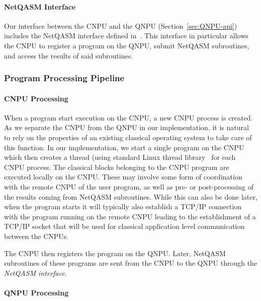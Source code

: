 \paragraph{NetQASM Interface}

Our interface between the \ac{CNPU} and the \ac{QNPU} (Section~\ref{sec:QNPU-api}) includes the \ac{NetQASM} interface 
defined in~\cite[Appendix A]{dahlberg_2022_netqasm}. This interface in particular allows the \ac{CNPU} to register a program on the \ac{QNPU}, submit \ac{NetQASM} subroutines, and access the results of said subroutines.

\subsubsection{Program Processing Pipeline}

\paragraph{CNPU Processing}

When a program start execution on the \ac{CNPU}, a new \ac{CNPU} process is created. As we separate the \ac{CNPU} from the \ac{QNPU} in our implementation, it is natural to rely on the properties of an existing classical operating system to take care of this function. In our implementation, we start a single program on the \ac{CNPU} which then creates a thread (using standard Linux thread library~\cite{linux_threads} for each \ac{CNPU} process. The classical blocks belonging to the \ac{CNPU} program are executed locally on the \ac{CNPU}. These may involve some form of coordination with the remote \ac{CNPU} of the user program, as well as pre- or post-processing of the results coming from \ac{NetQASM} subroutines. While this can also be done later, when the program starts it will typically also establish a TCP/IP connection with the program running on the remote \ac{CNPU} leading to the establishment of a TCP/IP socket that will be used for classical application level communication between the \acp{CNPU}.

The \ac{CNPU} then registers the program on the \ac{QNPU}. Later, \ac{NetQASM} subroutines of these programs are sent from the \ac{CNPU} to the \ac{QNPU} through the \emph{\ac{NetQASM} interface}. 

\paragraph{QNPU Processing}

